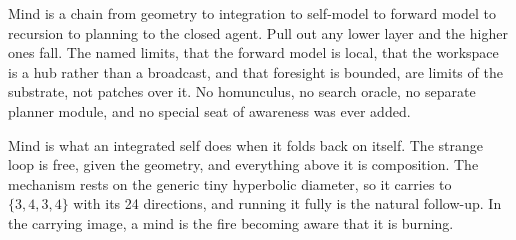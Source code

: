 \begin{principle}
Mind is a chain from geometry to integration to self-model to forward model to recursion to planning to the closed agent. Pull out any lower layer and the higher ones fall. The named limits, that the forward model is local, that the workspace is a hub rather than a broadcast, and that foresight is bounded, are limits of the substrate, not patches over it. No homunculus, no search oracle, no separate planner module, and no special seat of awareness was ever added.
\end{principle}

Mind is what an integrated self does when it folds back on itself. The strange loop is free, given the geometry, and everything above it is composition. The mechanism rests on the generic tiny hyperbolic diameter, so it carries to $\{3,4,3,4\}$ with its 24 directions, and running it fully is the natural follow-up. In the carrying image, a mind is the fire becoming aware that it is burning.
